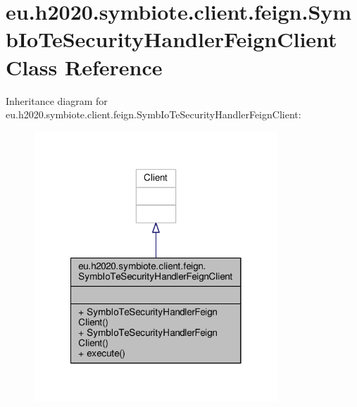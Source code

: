 \hypertarget{classeu_1_1h2020_1_1symbiote_1_1client_1_1feign_1_1SymbIoTeSecurityHandlerFeignClient}{}\section{eu.\+h2020.\+symbiote.\+client.\+feign.\+Symb\+Io\+Te\+Security\+Handler\+Feign\+Client Class Reference}
\label{classeu_1_1h2020_1_1symbiote_1_1client_1_1feign_1_1SymbIoTeSecurityHandlerFeignClient}


Inheritance diagram for eu.\+h2020.\+symbiote.\+client.\+feign.\+Symb\+Io\+Te\+Security\+Handler\+Feign\+Client\+:
\nopagebreak
\begin{figure}[H]
\begin{center}
\leavevmode
\includegraphics[width=260pt]{classeu_1_1h2020_1_1symbiote_1_1client_1_1feign_1_1SymbIoTeSecurityHandlerFeignClient__inherit__graph}
\end{center}
\end{figure}


